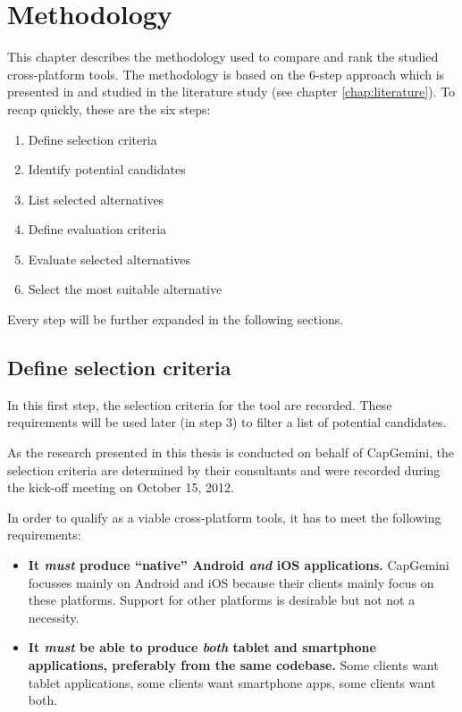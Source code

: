 \chapter{Methodology}
\label{chap:methodology}

This chapter describes the methodology used to compare and rank the studied cross-platform tools. The methodology is based on the 6-step approach which is presented in \cite{Jadhav:2011} and studied in the literature study (see chapter \ref{chap:literature}). To recap quickly, these are the six steps:

\begin{enumerate}
    \item Define selection criteria
    \item Identify potential candidates
    \item List selected alternatives
    \item Define evaluation criteria
    \item Evaluate selected alternatives
    \item Select the most suitable alternative
\end{enumerate}

Every step will be further expanded in the following sections.

\section{Define selection criteria}
\label{sec:selection-criteria}

In this first step, the selection criteria for the tool are recorded. These requirements will be used later (in step 3) to filter a list of potential candidates. 

As the research presented in this thesis is conducted on behalf of CapGemini, the selection criteria are determined by their consultants and were recorded during the kick-off meeting on October 15, 2012. 

In order to qualify as a viable cross-platform tools, it has to meet the following requirements:

\begin{itemize}
    \item \textbf{It \emph{must} produce ``native'' Android \emph{and} iOS applications.} CapGemini focusses mainly on Android and iOS because their clients mainly focus on these platforms. Support for other platforms is desirable but not not a necessity.
    \item \textbf{It \emph{must} be able to produce \emph{both} tablet and smartphone applications, preferably from the same codebase.} Some clients want tablet applications, some clients want smartphone apps, some clients want both.
\end{itemize}

